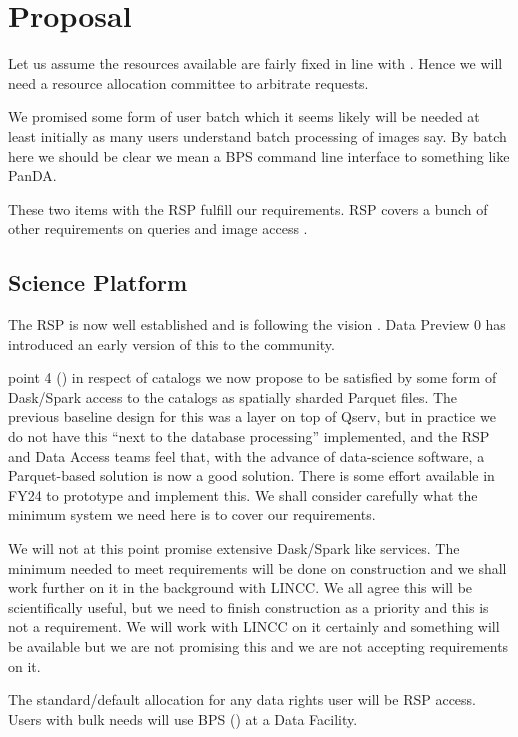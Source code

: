 \section{Proposal} \label{sec:proposal}

Let us assume the resources available are fairly fixed in line with .
Hence we will need a resource allocation  committee  to arbitrate requests.

We promised some form of user batch which it seems likely will be needed at least initially as many users understand batch processing of images say. By batch here we should be clear we mean a BPS command line interface to something like PanDA. 

These two items with the RSP fulfill our requirements.  RSP covers a bunch of other requirements on queries and image access .


\subsection{Science Platform}\label{sec:rsp}
The RSP is now well established and is following the vision .
Data Preview 0 has introduced an early version of this to the community.

 point 4 () in respect of catalogs we now propose to be satisfied by some form of Dask/Spark access to the catalogs as spatially sharded Parquet files.
The previous baseline design for this was a layer on top of Qserv, but in practice we do not have this ``next to the database processing'' implemented, and the RSP and Data Access teams feel that, with the advance of data-science software, a Parquet-based solution is now a good solution.
There is some effort available in FY24 to prototype and implement this.
We shall consider carefully what the minimum system we need here is to cover our requirements.

We will not at this point promise extensive Dask/Spark like services.
The minimum needed to meet requirements will be done on construction and we shall  work further  on it in the background with LINCC.
We all agree this will be scientifically useful, but we need to finish construction as a priority and this is not a requirement. We will work with LINCC on it certainly and something will be available but we are not promising this and we are not accepting requirements on it.

The standard/default allocation for any data rights user will be RSP access.
Users with bulk needs will use BPS () at a Data Facility.



